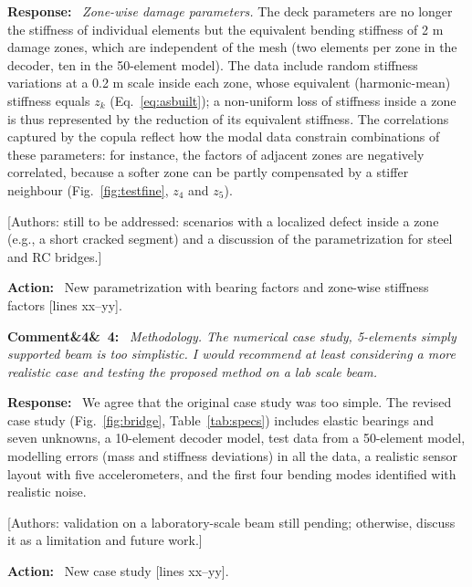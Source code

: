 \documentclass[11pt]{article}
\newenvironment{rcomment}[1]{\par\bigskip\noindent\textbf{Comment\ifx&#1&\else\ #1\fi:}\ \itshape}{\par}
\newenvironment{response}{\par\smallskip\noindent\color{resp}\textbf{Response:}\ }{\par}
\newenvironment{action}{\par\smallskip\noindent\color{resp}\textbf{Action:}\ }{\par}
\newcommand{\authornote}[1]{\textcolor{note}{\textsf{[Authors: #1]}}}
\newcommand{\tbd}[1]{\textcolor{note}{\textsf{[#1]}}}
\newcommand{\lines}[1]{\tbd{lines #1}}
\begin{document}
\begin{response}
\textit{Zone-wise damage parameters.} The deck parameters are no longer the stiffness of individual elements but the
equivalent bending stiffness of 2 m damage zones, which are independent of the mesh (two elements per zone in the
decoder, ten in the 50-element model). The data include random stiffness variations at a 0.2 m scale inside each zone,
whose equivalent (harmonic-mean) stiffness equals $z_k$ (Eq.~\eqref{eq:asbuilt}); a non-uniform loss of stiffness
inside a zone is thus represented by the reduction of its equivalent stiffness. The correlations captured by the copula
reflect how the modal data constrain combinations of these parameters: for instance, the factors of adjacent zones are
negatively correlated, because a softer zone can be partly compensated by a stiffer neighbour
(Fig.~\ref{fig:testfine}, $z_4$ and $z_5$).
\end{response}
\authornote{still to be addressed: scenarios with a localized defect inside a zone (e.g., a short cracked segment) and
a discussion of the parametrization for steel and RC bridges.}

\begin{action}
New parametrization with bearing factors and zone-wise stiffness factors \lines{xx--yy}.
\end{action}

\begin{rcomment}{4}
Methodology. The numerical case study, 5-elements simply supported beam is too simplistic. I would recommend at least
considering a more realistic case and testing the proposed method on a lab scale beam.
\end{rcomment}

\begin{response}
We agree that the original case study was too simple. The revised case study (Fig.~\ref{fig:bridge},
Table~\ref{tab:specs}) includes elastic bearings and seven unknowns, a 10-element decoder model, test data from a
50-element model, modelling errors (mass and stiffness deviations) in all the data, a realistic sensor layout with five
accelerometers, and the first four bending modes identified with realistic noise.
\end{response}
\authornote{validation on a laboratory-scale beam still pending; otherwise, discuss it as a limitation and future
work.}

\begin{action}
New case study \lines{xx--yy}.
\end{action}
\end{document}
